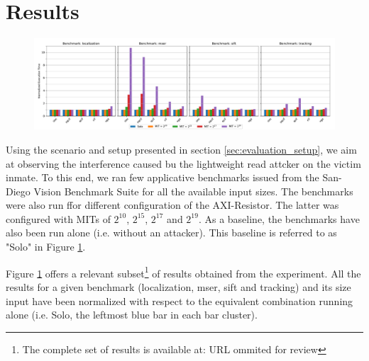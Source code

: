 \section{Results}
    \label{sec:results}
    \begin{figure}
        \centering
        \includegraphics[scale=0.425]{images/cpu-brainfreeze-interference.pdf}
        \caption{}
        \label{fig:cpu-brainfreeze-interference-results}
    \end{figure}


    Using the scenario and setup presented in section \ref{sec:evaluation_setup}, we aim at observing the interference caused bu the lightweight read attcker on the victim inmate. To this end, we ran few applicative benchmarks issued from the San-Diego Vision Benchmark Suite \cite{SD-VBS} for all the available input sizes. The benchmarks were also run ffor different configuration of the AXI-Resistor. The latter was configured with MITs of $2^{10}$, $2^{15}$, $2^{17}$ and $2^{19}$. As a baseline, the benchmarks have also been run alone (i.e. without an attacker). This baseline is referred to as "Solo" in Figure \ref{fig:cpu-brainfreeze-interference-results}.

    Figure \ref{fig:cpu-brainfreeze-interference-results} offers a relevant subset\footnote{The complete set of results is available at: URL ommited for review} of results obtained from the experiment. All the results for a given benchmark (localization, mser, sift and tracking) and its size input have been normalized with respect to the equivalent combination running alone (i.e. Solo, the leftmost blue bar in each bar cluster).

